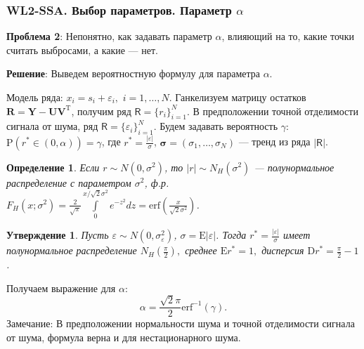 \documentclass[10pt, ucs, notheorems, handout]{beamer}
\newcommand{\tX}[1]{\mathsf{#1}}
\newcommand{\E}{\mbox{E}}
\newcommand{\D}{\mbox{D}}
\newtheorem{definition}{Определение}
\newtheorem{proposition}{Утверждение}
\begin{document}
\begin{frame}
\frametitle{WL2-SSA. Выбор параметров. Параметр $\alpha$}
\footnotesize{
\textbf{Проблема 2}:
Непонятно, как задавать параметр $\alpha$, влияющий на то, какие точки считать выбросами, а какие --- нет. 

\textbf{Решение}: 
Выведем вероятностную формулу для параметра $\alpha$. 

Модель ряда: $x_i=s_i+\varepsilon_i,$ $i=1,\ldots,N$. Ганкелизуем матрицу остатков $\mathbf{R}= \mathbf{Y} - \mathbf{U}\mathbf{V}^{\mathrm{T}}$, получим ряд $\tX{R}=\{r_i\}_{i=1}^N$. В предположении точной отделимости сигнала от шума, ряд $\tX{R}=\{\varepsilon_i\}_{i=1}^N$.
Будем задавать вероятность $\gamma$: $\mathrm{P}(r^*\in (0,\alpha))=\gamma$, где $r^*=\frac{|\varepsilon|}{\sigma}$, $\bm{\sigma} =(\sigma_1,\ldots,\sigma_N)$ --- тренд из ряда $|\tX{R}|$.

\begin{definition}
	\footnotesize Если $r \sim N(0, \sigma^2)$, то $|r| \sim N_{H}(\sigma^2)$ --- \alert{полунормальное распределение} с параметром $\sigma^2$, ф.р.
	$F_H(x;\sigma^2) = \frac{2}{\sqrt{\pi}}\int\limits_{0}^{x/\sqrt{2}\sigma^2} e^{-z^2} dz = \text{erf} (\frac{x}{\sqrt{2}\sigma^2})$.
\end{definition}
\begin{proposition}
	\footnotesize Пусть $\varepsilon\sim N(0,\sigma_{\varepsilon}^2)$, $\sigma=\E |\varepsilon|$. Тогда $r^{*}=\frac{|\varepsilon|}{\sigma}$ имеет полунормальное распределение $N_H(\frac{\pi}{2}),$ среднее $\E r^* = 1,$ дисперсия $\D r^* = \frac{\pi}{2}-1$.
\end{proposition}
Получаем выражение для $\alpha$:
\begin{equation*}
\alpha = \frac{\sqrt{2}\pi}{2} \text{erf}^{-1}(\gamma).
\end{equation*}
\alert{Замечание:}
	В предположении нормальности шума и точной отделимости сигнала от шума, формула верна и для нестационарного шума.  %
}
\end{frame}
\end{document}
